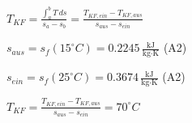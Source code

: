 \( T_{KF} = \frac{\int_a^b T \, ds}{s_a - s_b} = \frac{T_{KF,ein} - T_{KF,aus}}{s_{aus} - s_{ein}} \)  

\( s_{aus} = s_f(15^\circ C) = 0.2245 \, \frac{\text{kJ}}{\text{kg·K}} \) (A2)  

\( s_{ein} = s_f(25^\circ C) = 0.3674 \, \frac{\text{kJ}}{\text{kg·K}} \) (A2)  

\( T_{KF} = \frac{T_{KF,ein} - T_{KF,aus}}{s_{aus} - s_{ein}} = 70^\circ C \)